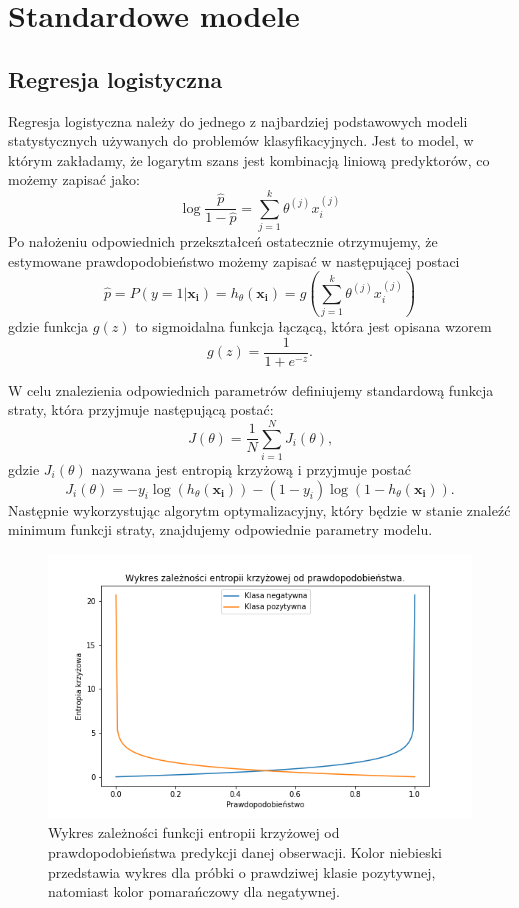 \documentclass[inzynierska]{pwr_wmat_praca_dyplomowa}
\theoremstyle{plain}
\numberwithin{theorem}{chapter}
\theoremstyle{definition}
\numberwithin{theorem}{chapter}
\begin{document}
\section{Standardowe modele}

\subsection{Regresja logistyczna}
\label{reg-log}
Regresja logistyczna należy do jednego z najbardziej podstawowych modeli statystycznych używanych do problemów klasyfikacyjnych. Jest to model, w którym zakładamy, że logarytm szans jest kombinacją liniową predyktorów, co możemy zapisać jako:
$$ \log{\frac{\hat{p}}{1 - \hat{p}}} = \sum_{j=1}^k \theta^{(j)}x_i^{(j)} $$
Po nałożeniu odpowiednich przekształceń ostatecznie otrzymujemy, że estymowane prawdopodobieństwo możemy zapisać w następującej postaci
\begin{equation}
	\hat{p} = P(y=1|\boldsymbol{x_i}) = h_{\theta}(\boldsymbol{x_i}) = g\left(\sum_{j=1}^k \theta^{(j)}x_i^{(j)} \right)
\end{equation} 
gdzie funkcja $g(z)$ to sigmoidalna funkcja łączącą, która jest opisana wzorem
$$ g(z) = \frac{1}{1+e^{-z}} \text{.}$$

W celu znalezienia odpowiednich parametrów definiujemy standardową funkcja straty, która przyjmuje następującą postać:
$$ J(\theta) = \frac{1}{N} \sum_{i=1}^N J_i(\theta) \text{,}$$
gdzie $J_i(\theta)$ nazywana jest entropią krzyżową i przyjmuje postać
\begin{equation}
	\label{c-e}
	J_i(\theta) = -y_i\log(h_{\theta}(\boldsymbol{x_i})) - (1-y_i)\log(1 - h_{\theta}(\boldsymbol{x_i})) \text{.}
\end{equation}
Następnie wykorzystując algorytm optymalizacyjny, który będzie w stanie znaleźć minimum funkcji straty, znajdujemy odpowiednie parametry modelu.

\begin{figure}[h]
	\includegraphics[width=\linewidth]{images/cross_entropy.png}
	\caption{Wykres zależności funkcji entropii krzyżowej od prawdopodobieństwa predykcji danej obserwacji. Kolor niebieski przedstawia wykres dla próbki o prawdziwej klasie pozytywnej, natomiast kolor pomarańczowy dla negatywnej.}
	\label{fig:cross-entropy-plot}
\end{figure}
\end{document}
